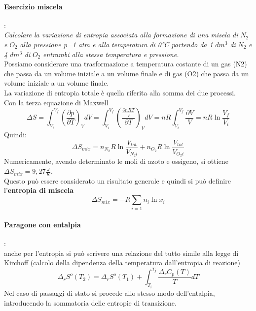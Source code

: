 \documentclass{article}
\begin{document}
\paragraph{Esercizio miscela}:\\
\textit{Calcolare la variazione di entropia associata alla formazione di una misela di} $N_2$ \textit{e} $O_2$ \textit{alla pressione p=1 atm e alla temperatura di 0°C partendo da 1} $dm^3$ \textit{di} $N_2$ \textit{e 4} $dm^3$ \textit{di} $O_2$ \textit{entrambi alla stessa temperatura e pressione.} \\
Possiamo considerare una trasformazione a temperatura costante di un gas (N2) che passa da un volume iniziale a un volume finale e di gas (O2) che passa da un volume iniziale a un volume finale.\\
La variazione di entropia totale è quella riferita alla somma dei due processi.\\


Con la terza equazione di Maxwell
\begin{equation*}
    \Delta S=\int_{V_i}^{V_f}(\frac{\partial p}{\partial T})_VdV=\int_{V_i}^{V_f}(\frac{\frac{\partial nRT}{V}}{\partial T})_VdV=nR\int_{V_i}^{V_f}\frac{\partial V}{V}=nR\ln{\frac{V_f}{V_i}}
\end{equation*}
Quindi:
\begin{equation*}
    \Delta S_{mix}=n_{N_2}R\ln{\frac{V_{tot}}{V_{N_2i}}}+n_{O_2}R\ln{\frac{V_{tot}}{V_{O_2i}}}
\end{equation*}
Numericamente, avendo determinato le moli di azoto e ossigeno, si ottiene $\Delta S_{mix}=9,27 \frac{J}{K}$.\\
Questo può essere considerato un risultato generale e quindi si può definire l'\textbf{entropia di miscela}
\begin{equation*}
    \Delta S_{mix}=-R\sum_{i=1}n_i\ln{x_i}
\end{equation*}

\paragraph{Paragone con entalpia}:
\\anche per l'entropia si può scrivere una relazione del tutto simile alla legge di Kirchoff (calcolo della dipendenza della temperatura dall'entropia di reazione)
\begin{equation*}
    \Delta_rS^o(T_2)=\Delta_rS^o(T_1)+\int_{T_i}^{T_f}\frac{\Delta_rC_p(T)}{T}dT
\end{equation*}
Nel caso di passaggi di stato si procede allo stesso modo dell'entalpia, introducendo la sommatoria delle entropie di transizione.
\end{document}
